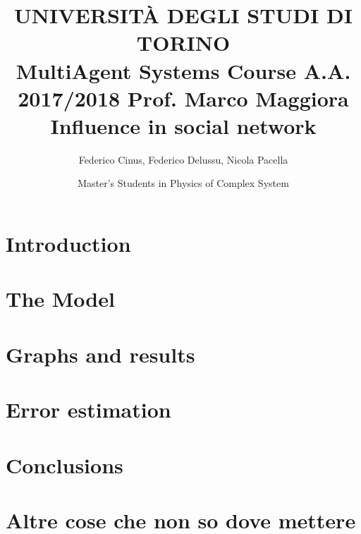 \documentclass[11pt,a4paper]{article}
\author{Federico Cinus, Federico Delussu, Nicola Pacella}
\author{Master’s Students in Physics of Complex System}
\title{ \LARGE{UNIVERSIT\`{A} DEGLI STUDI DI TORINO} 
\\
MultiAgent Systems Course A.A. 2017/2018 Prof. Marco Maggiora
\\
 \textbf{Influence in social network}}
\begin{document}
\date{}
\maketitle
\bigskip


\tableofcontents

\newpage 
\section{Introduction}

\section{The Model}

\section{Graphs and results}

\section{Error estimation}

\section{Conclusions}

\section{Altre cose che non so dove mettere}


\begin{comment}

\begin{center}
\texttt{[image: exe1\_smd.pdf]}
\end{center}
\newpage 

\end{comment}
\end{document}
